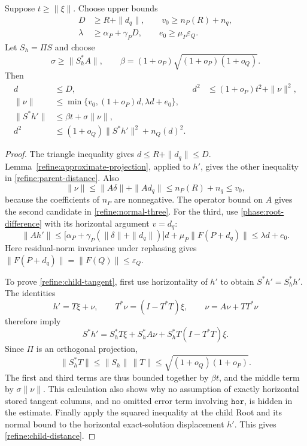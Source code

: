 \begin{proposition}\label{refine:relation-estimates}
Suppose $t\geq\|\xi\|$.  Choose upper bounds
\begin{equation}\label{refine:relation-constants}
 \begin{split}
 D&\geq R+\|d_q\|,\qquad
 v_0\geq n_P(R)+n_q,\\
 \lambda&\geq\alpha_P+\gamma_PD,\qquad
 e_0\geq\mu_P\varepsilon_Q.
 \end{split}
\end{equation}
Let $S_h=\Pi S$ and choose
\begin{equation}\label{refine:sigma-definition}
 \sigma\geq\|S_h^*A\|,
 \qquad
 \beta=(1+o_P)\sqrt{(1+o_P)(1+o_Q)}.
\end{equation}
Then
\begin{align}
 d&\leq D,
 & d^2&\leq(1+o_P)t^2+\|\nu\|^2,
 \label{refine:parent-distance}\\
 \|\nu\|&\leq
 \min\{v_0,(1+o_P)d,\lambda d+e_0\},
 \label{refine:normal-three}\\
 \|S^*h'\|&\leq\beta t+\sigma\|\nu\|,
 \label{refine:child-tangent}\\
 d^2&\leq(1+o_Q)\|S^*h'\|^2+n_Q(d)^2.
 \label{refine:child-distance}
\end{align}
\end{proposition}

\begin{proof}
The triangle inequality gives $d\leq R+\|d_q\|\leq D$.
Lemma~\ref{refine:approximate-projection}, applied to $h'$, gives the
other inequality in \eqref{refine:parent-distance}.  Also
\[
 \|\nu\|\leq\|A\delta\|+\|Ad_q\|
       \leq n_P(R)+n_q\leq v_0,
\]
because the coefficients of $n_P$ are nonnegative.  The operator bound
on $A$ gives the second candidate in \eqref{refine:normal-three}.
For the third, use \eqref{phase:root-difference} with its horizontal
argument $v=d_q$:
\[
 \|Ah'\|
 \leq\bigl[\alpha_P+\gamma_P(\|\delta\|+\|d_q\|)\bigr]d
       +\mu_P\|F(P+d_q)\|
 \leq\lambda d+e_0.
\]
Here residual-norm invariance under rephasing gives
$\|F(P+d_q)\|=\|F(Q)\|\leq\varepsilon_Q$.

To prove \eqref{refine:child-tangent}, first use horizontality of $h'$
to obtain $S^*h'=S_h^*h'$.  The identities
\[
 h'=T\xi+\nu,\qquad
 T^*\nu=(I-T^*T)\xi,\qquad
 \nu=A\nu+TT^*\nu
\]
therefore imply
\[
 S^*h'
 =S_h^*T\xi+S_h^*A\nu
       +S_h^*T(I-T^*T)\xi.
\]
Since $\Pi$ is an orthogonal projection,
\[
 \|S_h^*T\|
 \leq\|S_h\|\,\|T\|
 \leq\sqrt{(1+o_Q)(1+o_P)}.
\]
The first and third terms are thus bounded together by $\beta t$,
and the middle term by $\sigma\|\nu\|$.  This calculation also shows
why no assumption of exactly horizontal stored tangent columns, and
no omitted error term involving $\mathtt{hor}$, is hidden in the
estimate.  Finally apply the squared inequality at the child Root
and its normal bound to the horizontal exact-solution displacement
$h'$.  This gives \eqref{refine:child-distance}.
\end{proof}

